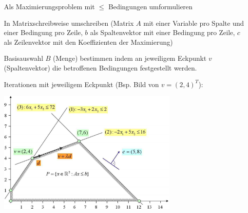   \begin{aufzaehlung}
    \item Als Maximierungsproblem mit $\leq$ Bedingungen umformulieren
    \item In Matrixschreibweise umschreiben (Matrix $A$ mit einer Variable pro Spalte und einer 
      Bedingung pro Zeile, $b$ als Spaltenvektor mit einer Bedingung pro Zeile, $c$ als 
      Zeilenvektor mit den Koeffizienten der Maximierung)
    \item Basisauswahl $B$ (Menge) bestimmen indem an jeweiligem Eckpunkt $v$ (Spaltenvektor) die betroffenen Bedingungen
          festgestellt werden.
    \item Iterationen mit jeweiligem Eckpunkt (Bsp. Bild von $v=(2,4)^T$):
        
        \begin{center}
        \includegraphics[width=9cm]{./Content/LinProg/simplex}
        \end{center}
  

\end{aufzaehlung}
